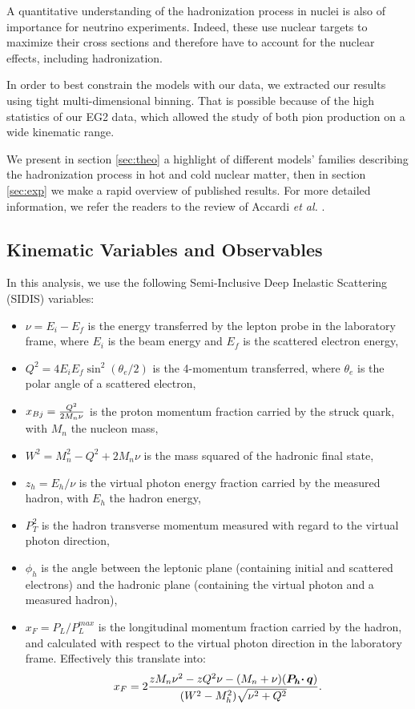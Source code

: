 A quantitative understanding of the hadronization process in nuclei is also of importance for neutrino experiments. Indeed, these use nuclear targets to maximize their cross sections and therefore have to account for the nuclear effects, including hadronization. 

In order to best constrain the models with our data, we extracted our results using tight multi-dimensional binning. That is possible because of the high statistics of our EG2 data, which allowed the study of both pion production on a wide kinematic range.

We present in section \ref{sec:theo} a highlight of different models' families describing the hadronization process in hot and cold nuclear matter, then in section \ref{sec:exp} we make a rapid overview of published results. For more detailed information, we refer the readers to the review of Accardi {\it et al.} \cite{Accardi:2009qv}.


\subsection{Kinematic Variables and Observables}

In this analysis, we use the following Semi-Inclusive Deep Inelastic Scattering (SIDIS) variables:
\begin{itemize}
 \item $\nu = E_i - E_f$ is the energy transferred by the lepton probe in the laboratory frame, where $E_i$ is the beam energy and $E_f$ is the scattered electron energy,
 \item $Q^2 = 4 E_i E_f \sin ^2(\theta_e / 2)$ is the 4-momentum transferred, where $\theta_e$ is the polar angle of a scattered electron,
 \item $x_{Bj} = {{Q^2} \over {2 M_n \nu}}$ is the proton momentum fraction carried by the struck quark, with $M_n$ the nucleon mass,
 \item $W^2 = M_n^2 - Q^2 + 2 M_n \nu$ is the mass squared of the hadronic final state,
 \item $z_h = E_h / \nu$ is the virtual photon energy fraction carried by the measured hadron, with $E_h$ the hadron energy,
 \item $P_T^2$ is the hadron transverse momentum measured with regard to the virtual photon direction,
 \item $\phi_h$ is the angle between the leptonic plane (containing initial and scattered electrons) and the hadronic plane (containing the virtual photon and a measured hadron),
 \item $x_F = P_L/P_L^{max}$ is the longitudinal momentum fraction carried by the hadron, and calculated with respect to the virtual photon direction in the laboratory frame.
 Effectively this translate into: $$ x_F = 2 {z M_n \nu^2 - z Q^2 \nu - (M_n+\nu)(\boldsymbol{P_h \cdotp q}) \over (W^2-M_h^2) \sqrt{\nu^2+Q^2} } .$$
\end{itemize}

